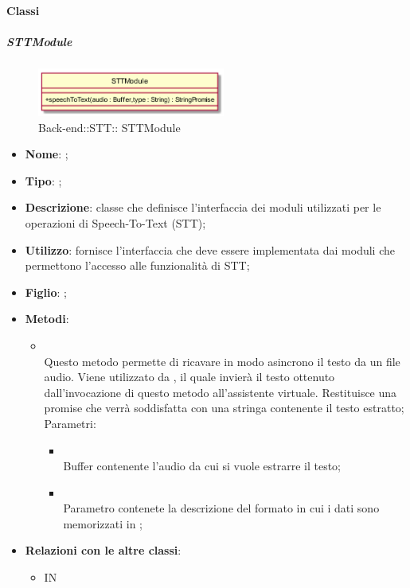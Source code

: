 \paragraph{Classi}
\hypertarget{ STTModule_label}{\subparagraph{ STTModule}}
\begin{figure}[h]
	\centering
	\includegraphics[width=0.55\textwidth,height=\textheight,keepaspectratio]{images/ClassSTTModule.png}
	\caption{Back-end::STT:: STTModule}
\end{figure}
\begin{itemize}
	\item \textbf{Nome}: ;
	\item \textbf{Tipo}: ;
	\item \textbf{Descrizione}: classe che definisce l'interfaccia dei moduli utilizzati per le operazioni di Speech-To-Text (STT);
	\item \textbf{Utilizzo}: fornisce l'interfaccia che deve essere implementata dai moduli che permettono l'accesso alle funzionalità di STT;
	\item \textbf{Figlio}: ;
	\item \textbf{Metodi}:
	\begin{itemize}
		\item[]  \\		Questo metodo permette di ricavare in modo asincrono il testo da un file audio. Viene utilizzato da , il quale invierà il testo ottenuto dall'invocazione di questo metodo all'assistente virtuale. Restituisce una promise che verrà soddisfatta con una stringa contenente il testo estratto;\\
		Parametri:
		\begin{itemize}
			\item {} \\
			Buffer contenente l'audio da cui si vuole estrarre il testo;
			\item {} \\
			Parametro contenete la descrizione del formato in cui i dati sono memorizzati in ;
		\end{itemize}
	\end{itemize}
	\item \textbf{Relazioni con le altre classi}:
	\begin{itemize}
		\item IN \hyperlink{VocalAPI_label}{}
	\end{itemize}
\end{itemize}
\FloatBarrier

